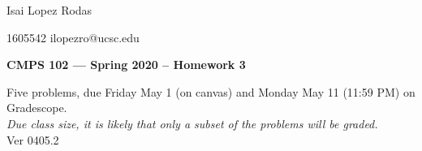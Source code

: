 \documentclass[11pt]{article}
\theoremstyle{definition}
\begin{document}
\hfill Isai  Lopez Rodas  

\hfill 1605542  ilopezro@ucsc.edu

\begin{center}
{\bf\Large 
CMPS 102 --- Spring 2020 --  Homework 3 %
}
\end{center}

\begin{center}
Five problems, due Friday May 1 (on canvas) and Monday May 11 (11:59 PM) on Gradescope.  \\
\textit{Due class size, it is likely that only a subset of the problems will be graded.} \\
Ver 0405.2
\end{center}



\medskip

\renewcommand{\P}{\mbox{IH}}
\end{document}
